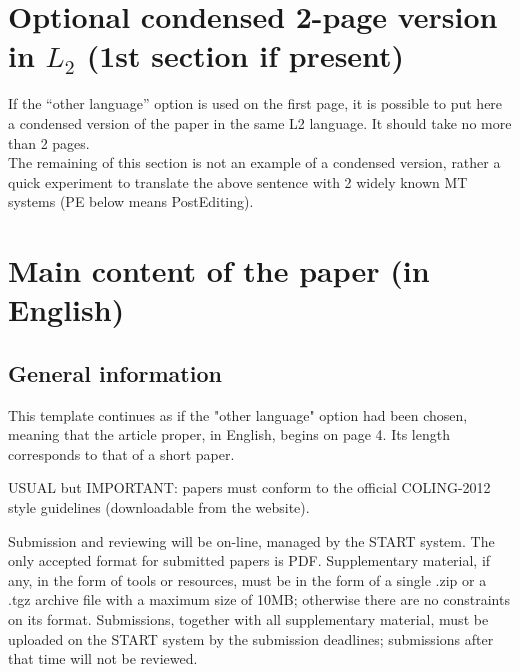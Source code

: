 \documentclass[10pt,a5paper,twoside]{article}
\begin{document}



\newpage
\section{Optional condensed 2-page version in $L_{2}$ (1st section if present)}
If the “other language” option is used on the first page, it is possible to put here a condensed version of the paper in the same L2 language. It should take no more than 2 pages.\\
The remaining of this section is not an example of a condensed version, rather a quick experiment to translate the above sentence with 2 widely known MT systems (PE below means  PostEditing).

\section{Main content of the paper (in English)}
\subsection{General information}
This template continues as if the "other language" option had been chosen, meaning that the article proper, in English, begins on page 4. Its length corresponds to that of a short paper.

USUAL but IMPORTANT: papers must conform to the official COLING-2012 style guidelines (downloadable from the website).

Submission and reviewing will be on-line, managed by the START system. The only accepted format for submitted papers is PDF. Supplementary material, if any, in the form of tools or resources, must be in the form of a single .zip or a .tgz archive file with a maximum size of 10MB; otherwise there are no constraints on its format. Submissions, together with all supplementary material, must be uploaded on the START system by the submission deadlines; submissions after that time will not be reviewed.
\end{document}
